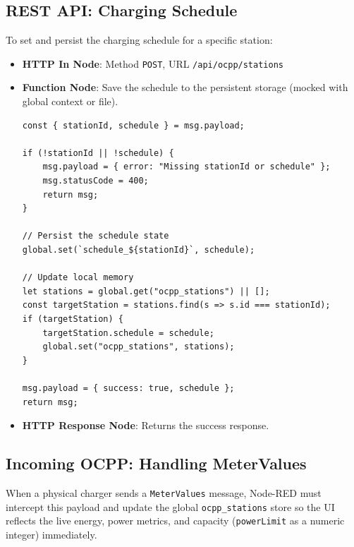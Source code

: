 \documentclass{article}
\begin{document}
\subsection{REST API: Charging Schedule}
To set and persist the charging schedule for a specific station:
\begin{itemize}
    \item \textbf{HTTP In Node}: Method \texttt{POST}, URL \texttt{/api/ocpp/stations}
    \item \textbf{Function Node}: Save the schedule to the persistent storage (mocked with global context or file).
\begin{lstlisting}[caption=Handle Charging Schedule Update]
const { stationId, schedule } = msg.payload;

if (!stationId || !schedule) {
    msg.payload = { error: "Missing stationId or schedule" };
    msg.statusCode = 400;
    return msg;
}

// Persist the schedule state
global.set(`schedule_${stationId}`, schedule);

// Update local memory
let stations = global.get("ocpp_stations") || [];
const targetStation = stations.find(s => s.id === stationId);
if (targetStation) {
    targetStation.schedule = schedule;
    global.set("ocpp_stations", stations);
}

msg.payload = { success: true, schedule };
return msg;
\end{lstlisting}
    \item \textbf{HTTP Response Node}: Returns the success response.
\end{itemize}

\subsection{Incoming OCPP: Handling MeterValues}
When a physical charger sends a \texttt{MeterValues} message, Node-RED must intercept this payload and update the global \texttt{ocpp\_stations} store so the UI reflects the live energy, power metrics, and capacity (\texttt{powerLimit} as a numeric integer) immediately.
\end{document}
